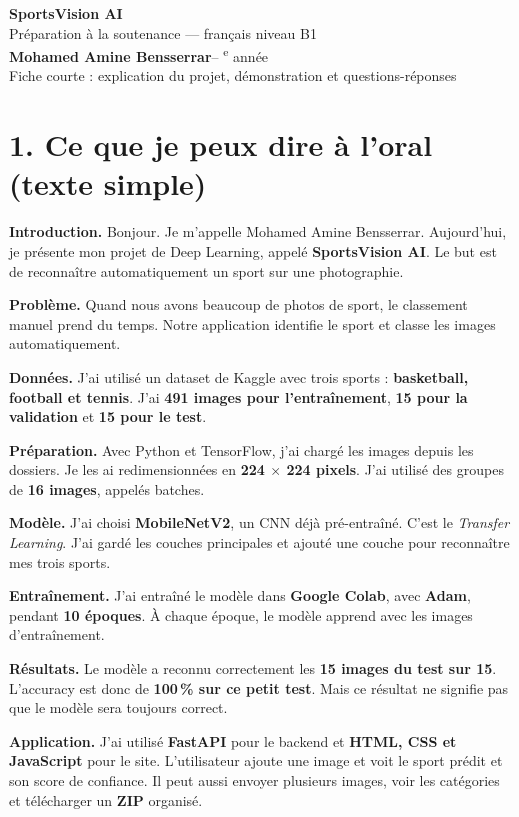 \documentclass[10pt,a4paper]{article}
\begin{document}
\begin{center}
{\LARGE\bfseries\color{vert} SportsVision AI}\\[4pt]
{\large Préparation à la soutenance --- français niveau B1}\\[6pt]
\textbf{Mohamed Amine Bensserrar}\quad -- \textsuperscript{e} année\\
\small Fiche courte : explication du projet, démonstration et questions-réponses
\end{center}
\vspace{-3mm}
\section{1. Ce que je peux dire à l'oral (texte simple)}
\textbf{Introduction.} Bonjour. Je m'appelle Mohamed Amine Bensserrar. Aujourd'hui, je présente mon projet de Deep Learning, appelé \textbf{SportsVision AI}. Le but est de reconnaître automatiquement un sport sur une photographie.

\textbf{Problème.} Quand nous avons beaucoup de photos de sport, le classement manuel prend du temps. Notre application identifie le sport et classe les images automatiquement.

\textbf{Données.} J'ai utilisé un dataset de Kaggle avec trois sports : \textbf{basketball, football et tennis}. J'ai \textbf{491 images pour l'entraînement}, \textbf{15 pour la validation} et \textbf{15 pour le test}.

\textbf{Préparation.} Avec Python et TensorFlow, j'ai chargé les images depuis les dossiers. Je les ai redimensionnées en \textbf{224 $\times$ 224 pixels}. J'ai utilisé des groupes de \textbf{16 images}, appelés batches.

\textbf{Modèle.} J'ai choisi \textbf{MobileNetV2}, un CNN déjà pré-entraîné. C'est le \emph{Transfer Learning}. J'ai gardé les couches principales et ajouté une couche pour reconnaître mes trois sports.

\textbf{Entraînement.} J'ai entraîné le modèle dans \textbf{Google Colab}, avec \textbf{Adam}, pendant \textbf{10 époques}. À chaque époque, le modèle apprend avec les images d'entraînement.

\textbf{Résultats.} Le modèle a reconnu correctement les \textbf{15 images du test sur 15}. L'accuracy est donc de \textbf{100\,\% sur ce petit test}. Mais ce résultat ne signifie pas que le modèle sera toujours correct.

\textbf{Application.} J'ai utilisé \textbf{FastAPI} pour le backend et \textbf{HTML, CSS et JavaScript} pour le site. L'utilisateur ajoute une image et voit le sport prédit et son score de confiance. Il peut aussi envoyer plusieurs images, voir les catégories et télécharger un \textbf{ZIP} organisé.
\end{document}
